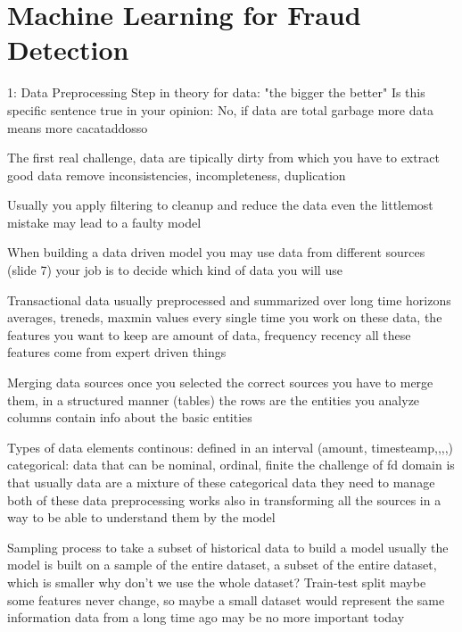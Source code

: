 \chapter{Machine Learning for Fraud Detection}

1: Data Preprocessing Step
    in theory for data: "the bigger the better"
    Is this specific sentence true in your opinion:
        No, if data are total garbage more data means more cacataddosso

        The first real challenge, data are tipically dirty
            from which you have to extract good data 
            remove inconsistencies, incompleteness, duplication

            Usually you apply filtering to cleanup and reduce the data 
            even the littlemost mistake may lead to a faulty model 

    When building a data driven model you may use data from different sources (slide 7)
        your job is to decide which kind of data you will use 
    
    Transactional data 
        usually preprocessed and summarized over long time horizons 
        averages, treneds, maxmin values
        every single time you work on these data, the features you want to keep are amount of data, frequency recency
        all these features come from expert driven things

    Merging data sources 
        once you selected the correct sources you have to merge them, in a structured manner (tables) 
            the rows are the entities you analyze
            columns contain info about the basic entities

    Types of data elements
        continous: defined in an interval (amount, timesteamp,,,,)
        categorical: data that can be nominal, ordinal, finite 
            the challenge of fd domain is that usually data are a mixture of these categorical data 
            they need to manage both of these data 
            preprocessing works also in transforming all the sources in a way to be able to understand them by the model 

    Sampling 
        process to take a subset of historical data to build a model 
        usually the model is built on a sample of the entire dataset, a subset of the entire dataset, which is smaller
        why don't we use the whole dataset?
            Train-test split 
            maybe some features never change, so maybe a small dataset would represent the same information
            data from a long time ago may be no more important today


